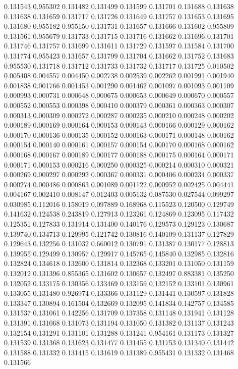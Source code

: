 0.131543
0.955302
0.131482
0.131499
0.131599
0.131701
0.131688
0.131638
0.131638
0.131659
0.131717
0.131726
0.131649
0.131757
0.131653
0.131695
0.131680
0.955182
0.955150
0.131731
0.131657
0.131666
0.131602
0.955809
0.131561
0.955679
0.131733
0.131715
0.131716
0.131662
0.131696
0.131701
0.131746
0.131757
0.131699
0.131611
0.131729
0.131597
0.131584
0.131700
0.131774
0.955423
0.131657
0.131799
0.131704
0.131662
0.131752
0.131683
0.955530
0.131718
0.131712
0.131733
0.131732
0.131717
0.131725
0.010502
0.005408
0.004557
0.004450
0.002738
0.002539
0.002262
0.001991
0.001940
0.001838
0.001766
0.001453
0.001290
0.001462
0.001097
0.001093
0.001109
0.000993
0.000731
0.000648
0.000675
0.000653
0.000649
0.000670
0.000557
0.000552
0.000553
0.000398
0.000410
0.000379
0.000361
0.000363
0.000307
0.000313
0.000309
0.000272
0.000287
0.000235
0.000210
0.000248
0.000202
0.000189
0.000169
0.000164
0.000153
0.000143
0.000166
0.000129
0.000162
0.000170
0.000136
0.000135
0.000152
0.000163
0.000171
0.000148
0.000162
0.000154
0.000140
0.000161
0.000157
0.000154
0.000170
0.000168
0.000162
0.000168
0.000167
0.000189
0.000177
0.000188
0.000175
0.000164
0.000171
0.000171
0.000153
0.000216
0.000250
0.000325
0.000214
0.000310
0.000321
0.000269
0.000297
0.000292
0.000367
0.000331
0.000406
0.000234
0.000337
0.000274
0.000486
0.000863
0.001089
0.001122
0.000952
0.002425
0.004441
0.004167
0.002410
0.008147
0.012403
0.005132
0.087530
0.027544
0.099297
0.030985
0.112016
0.158019
0.097889
0.168968
0.115523
0.120500
0.129749
0.141632
0.124538
0.243819
0.127913
0.123261
0.124869
0.123095
0.117432
0.125351
0.127833
0.131914
0.131400
0.140176
0.129573
0.129123
0.130687
0.139740
0.134713
0.129995
0.121742
0.130816
0.140109
0.131137
0.127829
0.129643
0.132256
0.131032
0.660012
0.130791
0.131387
0.130177
0.128813
0.139955
0.129499
0.130957
0.129917
0.145765
0.145840
0.132985
0.132816
0.132824
0.134618
0.132600
0.131814
0.132368
0.133201
0.131050
0.131159
0.132012
0.131396
0.855365
0.131602
0.130657
0.132497
0.883381
0.135250
0.132052
0.133175
0.130356
0.133469
0.133159
0.132152
0.133101
0.130961
0.133055
0.131480
0.926974
0.133366
0.131129
0.131441
0.130597
0.131828
0.133347
0.130894
0.161504
0.132669
0.132095
0.141834
0.142757
0.134585
0.131537
0.131061
0.142256
0.131709
0.137358
0.131148
0.131941
0.131128
0.131391
0.131068
0.131073
0.131194
0.131050
0.131382
0.131137
0.131243
0.132154
0.131291
0.131101
0.131288
0.131241
0.954161
0.131173
0.131327
0.131539
0.131368
0.131623
0.131477
0.131455
0.131753
0.131340
0.131442
0.131588
0.131332
0.131415
0.131619
0.131389
0.955431
0.131332
0.131468
0.131566

